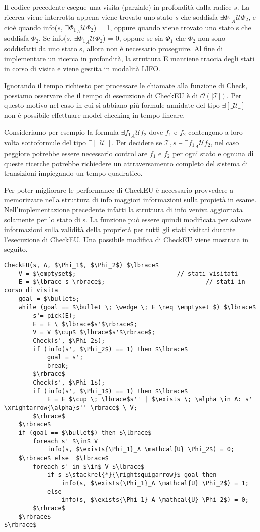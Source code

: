 Il codice precedente esegue una visita (parziale) in profondità dalla radice $s$. La ricerca viene interrotta appena viene trovato uno stato $s$ che soddisfa $\exists{\Phi_1}_A \mathcal{U} \Phi_2$, e cioè quando info($s$, $\exists{\Phi_1}_A \mathcal{U} \Phi_2$) = 1, oppure quando viene trovato uno stato s che soddisfa $\Phi_2$. Se info($s$, $\exists{\Phi_1}_A \mathcal{U} \Phi_2$) = 0, oppure se sia $\Phi_1$ che $\Phi_2$ non sono soddisfatti da uno stato s, allora non è necessario proseguire.
Al fine di implementare un ricerca in profondità, la struttura E mantiene traccia degli stati in corso di visita e viene gestita in modalità LIFO.


Ignorando il tempo richiesto per processare le chiamate alla funzione di Check, possiamo osservare che il tempo di esecuzione di CheckEU è di $\mathcal{O}(|\mathcal{T}|)$. Per questo motivo nel caso in cui si abbiano più formule annidate del tipo $\exists[\mathcal{\_U\_}]$ non è possibile effettuare model checking in tempo lineare. 

Consideriamo per esempio la formula $\exists{f_1}_A \mathcal{U} f_2$ dove $f_1$ e $f_2$ contengono a loro volta sottoformule del tipo $\exists[\mathcal{\_U\_}]$. Per decidere se $\mathcal{T}, s \models \exists{f_1}_A \mathcal{U} f_2$, nel caso peggiore potrebbe essere necessario controllare $f_1$ e $f_2$ per ogni stato e ognuna di queste ricerche potrebbe richiedere un attraversamento completo del sistema di transizioni impiegando un tempo quadratico\cite{ALMC}.

Per poter migliorare le performance di CheckEU è necessario provvedere  a memorizzare nella struttura	 di info maggiori informazioni sulla propietà in esame. Nell'implementazione precedente infatti la struttura di info veniva aggiornata solamente per lo stato di s. La funzione può essere quindi modificata per salvare informazioni sulla validità della proprietà per tutti gli stati visitati durante l'esecuzione di CheckEU.
Una possibile modifica di CheckEU viene mostrata in seguito.
\\
\begin{lstlisting}[mathescape, caption=Implementazione modificata di CheckEU]
CheckEU(s, A, $\Phi_1$, $\Phi_2$) $\lbrace$
	V = $\emptyset$; 							// stati visitati
	E = $\lbrace s \rbrace$; 							// stati in corso di visita
	goal = $\bullet$;
	while (goal == $\bullet \; \wedge \; E \neq \emptyset $) $\lbrace$
		s'= pick(E);
		E = E \ $\lbrace$s'$\rbrace$;
		V = V $\cup$ $\lbrace$s'$\rbrace$;
		Check(s', $\Phi_2$);
		if (info(s', $\Phi_2$) == 1) then $\lbrace$
			goal = s';
			break;
		$\rbrace$
		Check(s', $\Phi_1$);
		if (info(s', $\Phi_1$) == 1) then $\lbrace$
			E = E $\cup \; \lbrace$s'' | $\exists \; \alpha \in A: s' \xrightarrow{\alpha}s'' \rbrace$ \ V;
		$\rbrace$	
	$\rbrace$
	if (goal == $\bullet$) then $\lbrace$
		foreach s' $\in$ V										
			info(s, $\exists{\Phi_1}_A \mathcal{U} \Phi_2$) = 0;
	$\rbrace$ else	$\lbrace$								
		foreach s' in $\in$ V $\lbrace$
			if s $\stackrel{*}{\rightsquigarrow}$ goal then
				info(s, $\exists{\Phi_1}_A \mathcal{U} \Phi_2$) = 1;
			else
				info(s, $\exists{\Phi_1}_A \mathcal{U} \Phi_2$) = 0;
		$\rbrace$
	$\rbrace$
$\rbrace$
\end{lstlisting}

